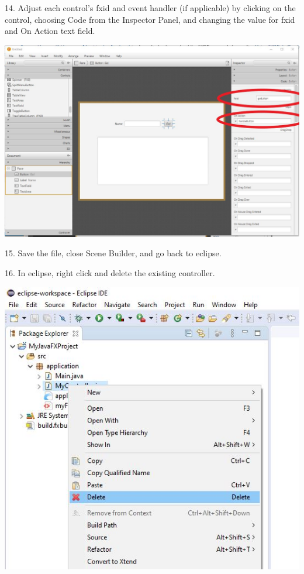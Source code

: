 \documentclass{beamer}
\begin{document}
\begin{frame}
14. Adjust each control’s fxid and event handler (if applicable) by clicking on the control, choosing Code from the Inspector Panel, and changing the value for fxid and On Action text field.

        \begin{center}
            \includegraphics[scale=.3]{step4.jpg}
        \end{center}
\end{frame}

\begin{frame}
15. Save the file, close Scene Builder, and go back to eclipse.
\end{frame}

\begin{frame}
16. In eclipse, right click and delete the existing controller.
        \begin{center}
            \includegraphics[scale=.4]{delete_controller.jpg}
        \end{center}
\end{frame}
\end{document}

